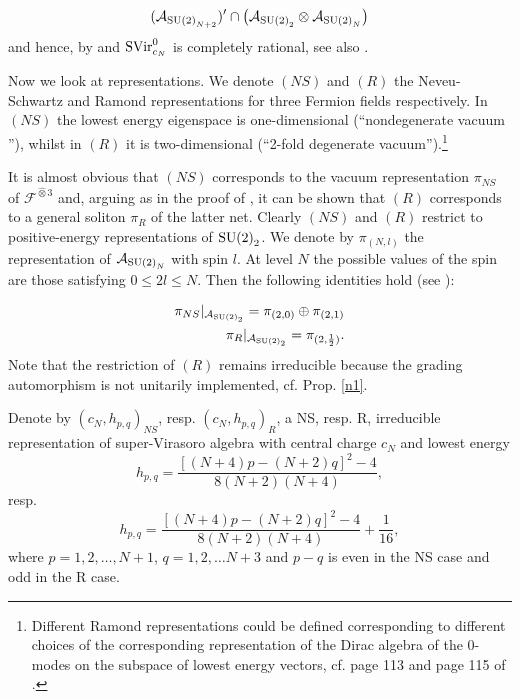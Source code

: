 \documentclass[11pt]{article}
\def\A{{\cal A}}
\def\su2{{{\rm SU}(2)}}
\def\A{{\mathcal A}}
\def\F{{\mathcal F}}
\begin{document}
\begin{equation}
\label{BoseCoset}
(\A_{\su2_{N+2}})'\cap \left( \A_{\su2_2}\otimes \A_{\su2_N} \right)
\end{equation}
and hence, by \cite[Corollary 3.4]{X2} and \cite[Theorem 24]{L03} 
${\rm SVir}^0_{c_N}
$ is completely rational, see also \cite[Corollary 28]{L03}. 

Now we look at representations. We denote $(NS)$ and $(R)$ the 
Neveu-Schwartz and Ramond representations for three Fermion fields 
respectively. In $(NS)$ the lowest energy eigenspace is one-dimensional
(``nondegenerate vacuum ''), whilst 
in $(R)$ it is two-dimensional (``2-fold degenerate vacuum'').\footnote{Different Ramond 
representations could be defined corresponding to different choices of the corresponding representation of the Dirac algebra of the 0-modes on the subspace of  lowest energy vectors, 
cf. page 113 and page 115 of \cite{GKO}.} 

It is almost obvious that $(NS)$ corresponds to the vacuum 
representation $\pi_{NS}$ of $\F^{\hat{\otimes}3}$ and, 
arguing as in the proof of \cite[Lemma 4.3]{Bock}, it can be 
shown that $(R)$ corresponds to a general soliton  
$\pi_R$ of the latter net. 
Clearly $(NS)$ and $(R)$ restrict to positive-energy 
representations of $\su2_2$. We denote by 
$\pi_{(N,l)}$ the representation of $\A_{\su2_N}$ with spin $l$. 
At level $N$ the possible values of the spin are those satisfying 
$0\leq 2l \leq N$. Then the following identities hold (see \cite[page 
116]{GKO}): 

\begin{eqnarray}
\label{NSrest} 
\pi_{NS}|_{\A_{\su2_2}} = \pi_{(2,0)} \oplus \pi_{(2,1)} \\
\label{Rrest}
\pi_R|_{\A_{\su2_2}} = \pi_{(2,\frac{1}{2})}.
\end{eqnarray}   
Note that the restriction of $(R)$ remains irreducible because the 
grading automorphism is not unitarily implemented, cf. Prop. \ref{n1}. 

Denote by $(c_N,h_{p,q})_{NS}$, resp. $(c_N,h_{p,q})_{R}$, a 
NS, resp. R, irreducible representation of super-Virasoro algebra with central 
charge $c_N$ and lowest energy 
$$h_{p,q}=\frac{\left[(N+4)p-(N+2)q\right]^2 -4}{8(N+2)(N+4)},$$
resp. 
$$h_{p,q}=\frac{\left[(N+4)p-(N+2)q\right]^2 -4}{8(N+2)(N+4)} + 
\frac{1}{16},$$
where $p=1,2,\dots,N+1$, $q=1,2, \dots N+3$ and $p-q$ is even in the 
NS case and odd in the R case. 
\end{document}
